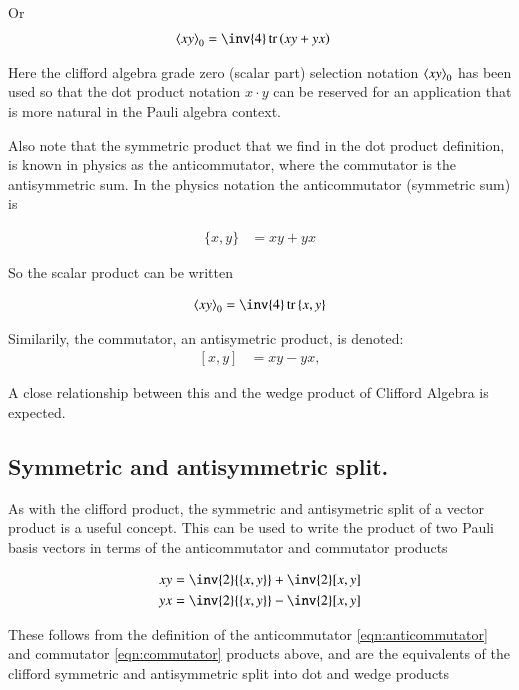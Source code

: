 \documentclass{article}
\DeclareMathOperator{\tr}{tr}
\newcommand{\trace}[1]{\tr{#1}}
\newcommand{\traceB}[1]{\tr\left({#1}\right)}
\newcommand{\symmetric}[2]{{\{{#1},{#2}\}}}
\newcommand{\antisymmetric}[2]{[{#1},{#2}]}
\begin{document}
Or
\begin{align}
\gpgradezero{x y} &= \inv{4}\traceB{x y + y x}
\end{align}

Here the clifford algebra grade zero (scalar part) selection notation ${\left\langle{{x y}}\right\rangle}_{0}$ has been used so that the dot product notation $x \cdot y$ can be reserved for an application that is more natural in the Pauli algebra context.

Also note that the symmetric product that we find in the dot product definition, is known in physics as the anticommutator, where the commutator
is the antisymmetric sum.  In the physics notation the anticommutator (symmetric sum) is

\begin{align}\label{eqn:anticommutator}
\symmetric{x}{y} &= x y + y x
\end{align}

So the scalar product can be written

\begin{align}
\gpgradezero{ x y } = \inv{4}\trace{\symmetric{x}{y}}
\end{align}

Similarily, the commutator, an antisymetric product, is denoted:
\begin{align}\label{eqn:commutator}
\antisymmetric{x}{y} &= x y - y x,
\end{align}

A close relationship between this and the wedge product of Clifford Algebra is
expected.

\subsection{ Symmetric and antisymmetric split. }

As with the clifford product, the symmetric and antisymetric split of a vector
product is a useful concept.  This can be used to write the product 
of two Pauli basis vectors in terms of the anticommutator and commutator 
products

\begin{align}
x y &= \inv{2} \symmetric{x}{y} + \inv{2} \antisymmetric{x}{y} \\
y x &= \inv{2} \symmetric{x}{y} - \inv{2} \antisymmetric{x}{y}
\end{align}

These follows from the definition of the anticommutator 
\ref{eqn:anticommutator}
and commutator 
\ref{eqn:commutator}
products above, and are the equivalents of the clifford symmetric and antisymmetric split into dot and wedge products
\end{document}
